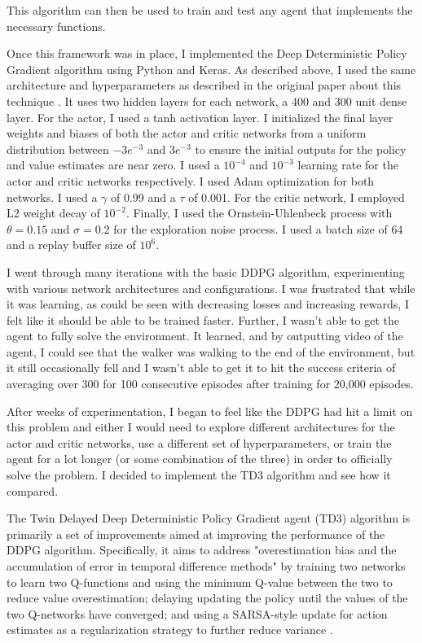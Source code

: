 \documentclass{article}
\begin{document}
This algorithm can then be used to train and test any agent that implements the necessary functions. 

Once this framework was in place, I implemented the Deep Deterministic Policy Gradient algorithm using Python and Keras. As described above, I used the same architecture and hyperparameters as described in the original paper about this technique \cite{DBLP:journals/corr/LillicrapHPHETS15}. It uses two hidden layers for each network, a 400 and 300 unit dense layer. For the actor, I used a tanh activation layer. I initialized the final layer weights and biases of both the actor and critic networks from a uniform distribution between $-3e^{-3}$ and $3e^{-3}$ to ensure the initial outputs for the policy and value estimates are near zero. I used a $10^{-4}$ and $10^{-3}$ learning rate for the actor and critic networks respectively. I used Adam optimization for both networks. I used a $\gamma$ of 0.99 and a $\tau$ of 0.001. For the critic network, I employed L2 weight decay of $10^{-2}$. Finally, I used the Ornstein-Uhlenbeck process with $\theta = 0.15$ and $\sigma = 0.2$ for the exploration noise process. I used a batch size of 64 and a replay buffer size of $10^{6}$. 

I went through many iterations with the basic DDPG algorithm, experimenting with various network architectures and configurations. I was frustrated that while it was learning, as could be seen with decreasing losses and increasing rewards, I felt like it should be able to be trained faster. Further, I wasn't able to get the agent to fully solve the environment. It learned, and by outputting video of the agent, I could see that the walker was walking to the end of the environment, but it still occasionally fell and I wasn't able to get it to hit the success criteria of averaging over 300 for 100 consecutive episodes after training for 20,000 episodes.

After weeks of experimentation, I began to feel like the DDPG had hit a limit on this problem and either I would need to explore different architectures for the actor and critic networks, use a different set of hyperparameters, or train the agent for a lot longer (or some combination of the three) in order to officially solve the problem. I decided to implement the TD3 algorithm and see how it compared. 

The Twin Delayed Deep Deterministic Policy Gradient agent (TD3) algorithm is primarily a set of improvements aimed at improving the performance of the DDPG algorithm. Specifically, it aims to address "overestimation bias and the accumulation of error in temporal difference methods" by training two networks to learn two Q-functions and using the minimum Q-value between the two to reduce value overestimation; delaying updating the policy until the values of the two Q-networks have converged; and using a SARSA-style update for action estimates as a regularization strategy to further reduce variance \cite{DBLP:journals/corr/abs-1802-09477}. 
\end{document}
